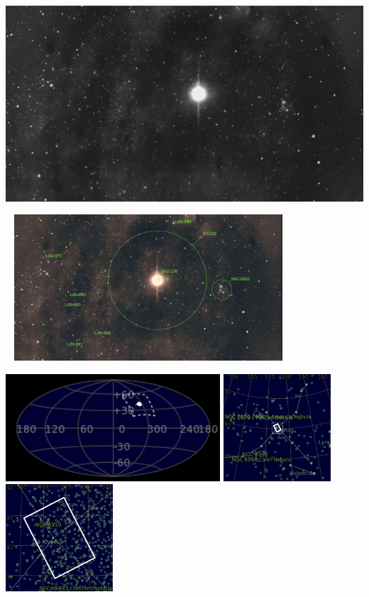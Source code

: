 {\footnotesize\color{white}


}\ \\
\includegraphics[width=\textwidth]{../Imaging//Grayscale/Sadr_Star.jpg}
\begin{center}
 \ \newpage
\includegraphics[width=0.75\textwidth]{../Imaging//Annotated/Sadr_Star_Annotated.jpg}

\includegraphics[height=4cm]{../Imaging//Annotated/Sadr_Star_Globe.jpg}
\includegraphics[height=4cm]{../Imaging//Annotated/Sadr_Star_Close.jpg}
\includegraphics[height=4cm]{../Imaging//Annotated/Sadr_Star_Closer.jpg}
\end{center}
